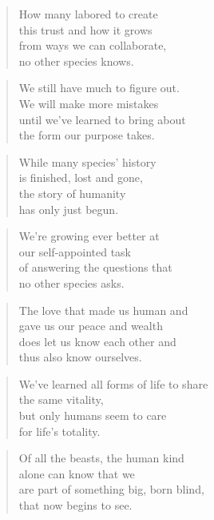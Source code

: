 \documentclass[14pt,a4paper]{article}
\begin{document}
\begin{verse}
How many labored to create\\
this trust and how it grows\\
from ways we can collaborate,\\
no other species knows.
\end{verse}

\begin{verse}
We still have much to figure out.\\
We will make more mistakes\\
until we’ve learned to bring about\\
the form our purpose takes.
\end{verse}

\begin{verse}
While many species’ history\\
is finished, lost and gone,\\
the story of humanity\\
has only just begun.
\end{verse}

\begin{verse}
We’re growing ever better at\\
our self-appointed task\\
of answering the questions that\\
no other species asks.
\end{verse}

\begin{verse}
The love that made us human and\\
gave us our peace and wealth\\
does let us know each other and\\
thus also know ourselves.
\end{verse}

\begin{verse}
We’ve learned all forms of life to share\\
the same vitality,\\
but only humans seem to care\\
for life’s totality.
\end{verse}

\begin{verse}
Of all the beasts, the human kind\\
alone can know that we\\
are part of something big, born blind,\\
that now begins to see.
\end{verse}
\end{document}
